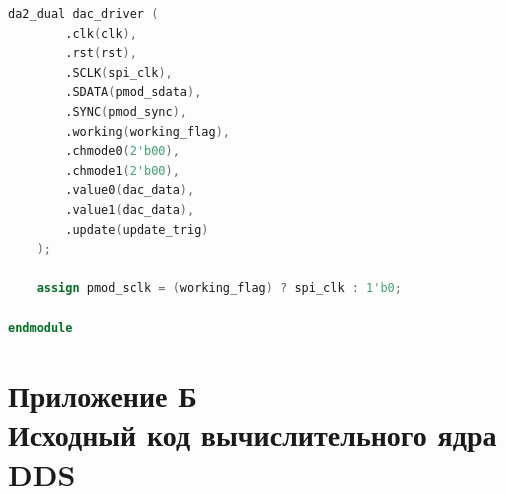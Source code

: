 \documentclass[12pt,a4paper,TimesNewRoman]{article}
\begin{document}
\begin{lstlisting}[language=Verilog, frame=none,caption={RTL-описание верхнего модуля (top.sv)}]
    da2_dual dac_driver (
        .clk(clk),
        .rst(rst),
        .SCLK(spi_clk),       
        .SDATA(pmod_sdata),   
        .SYNC(pmod_sync),     
        .working(working_flag),
        .chmode0(2'b00),      
        .chmode1(2'b00),      
        .value0(dac_data),
        .value1(dac_data),
        .update(update_trig)
    );

    assign pmod_sclk = (working_flag) ? spi_clk : 1'b0;

endmodule
\end{lstlisting}

\newpage
\section*{Приложение Б \\ Исходный код вычислительного ядра DDS}
\end{document}
